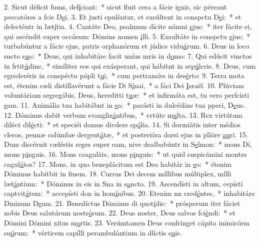 2. Sicut déficit fums, def\uline{í}ciant:~* sicut fluit cera a fácie ignis, sic péreant peccatóres a fcie D\uline{e}i.
3. Et justi epuléntur, et exsúltent in conspctu D\uline{e}i:~* et delecténtr in læt\uline{í}tia.
4. Cantáte Deo, psalmum dícite nómni \uline{e}jus:~* iter fácite ei, qui ascéndit super occásum: Dómins nomen \uline{i}lli.
5. Exsultáte in conspctu \uline{e}jus:~* turbabúntur a fácie ejus, patris orphanórum et júdics vidu\uline{á}rum.
6. Deus in loco sncto s\uline{u}o:~* Deus, qui inhabitáre facit uníus mris in d\uline{o}mo:
7. Qui edúcit vinctos in frtit\uline{ú}dine,~* simíliter eos qui exásperant, qui hábitnt in sep\uline{ú}lcris.
8. Deus, cum egrederéris in conspéctu pópli t\uline{u}i,~* cum pertransírs in des\uline{é}rto:
9. Terra mota est, étenim cæli distillavérunt a fácie Di S\uline{í}nai,~* a fáci Dei \uline{I}sraël.
10. Plúviam voluntáriam segregábis, Deus, hereditti t\uline{u}æ:~* et infirmáta est, tu vero perfcísti \uline{e}am.
11. Animália tua habitábnt in \uline{e}a:~* parásti in dulcédine tua pperi, D\uline{e}us.
12. Dóminus dabit verbum evangliz\uline{á}ntibus,~* vrtúte m\uline{u}lta.
13. Rex virtútum diléct dil\uline{é}cti:~* et speciéi domus divdere sp\uline{ó}lia.
14. Si dormiátis inter médios cleros, pennæ colúmbæ dergent\uline{á}tæ,~* et posterióra dorsi ejus in pllóre \uline{au}ri.
15. Dum discérnit cæléstis reges super eam, nive dealbabúntr in S\uline{e}lmon:~* mons Di, mons p\uline{i}nguis.
16. Mons coaguláts, mons p\uline{i}nguis:~* ut quid suspicámini montes cagul\uline{á}tos?
17. Mons, in quo beneplácitum est Deo habitár in \uline{e}o:~* étenim Dóminus habitbit in f\uline{i}nem.
18. Currus Dei decem míllibus múltiplex, mílli læt\uline{á}ntium:~* Dóminus in eis in Sna in s\uline{a}ncto.
19. Ascendísti in altum, cepísti captvit\uline{á}tem:~* accepísti don in hom\uline{í}nibus.
20. Etenim nn cred\uline{é}ntes,~* inhabitáre Dminum D\uline{e}um.
21. Benedíctus Dóminus di quot\uline{í}die:~* prósperum iter fáciet nobis Deus salutárum nostr\uline{ó}rum.
22. Deus noster, Deus salvos fci\uline{é}ndi:~* et Dómini Dómini xitus m\uline{o}rtis.
23. Verúmtamen Deus confrínget cápita inimicórm su\uline{ó}rum:~* vérticem capílli perambulántium in dlíctis s\uline{u}is.
